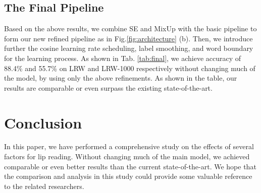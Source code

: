 \documentclass{article}
\begin{document}
\subsection{The Final Pipeline}
Based on the above results, we combine SE and MixUp with the basic pipeline to form our new refined pipeline as in Fig.\ref{fig:architecture} (b). Then, we introduce further the cosine learning rate scheduling, label smoothing, and word boundary  for the learning process. As shown in Tab. \ref{tab:final}, we achieve accuracy of 88.4\% and 55.7\% on LRW and LRW-1000 respectively without changing much of the model, by using only the above refinements. As shown in the table, our results are comparable or even surpass the existing state-of-the-art.
\vspace{-0.5em}
\section{Conclusion}
\vspace{-0.5em}
In this paper, we have performed a comprehensive study on the effects of several factors for lip reading. Without changing much of the main model, we achieved comparable or even better results than the current state-of-the-art. We hope that the comparison and analysis in this study could provide some valuable reference to the related researchers. \vfill\pagebreak

\label{sec:refs}

\small{

}
\end{document}
